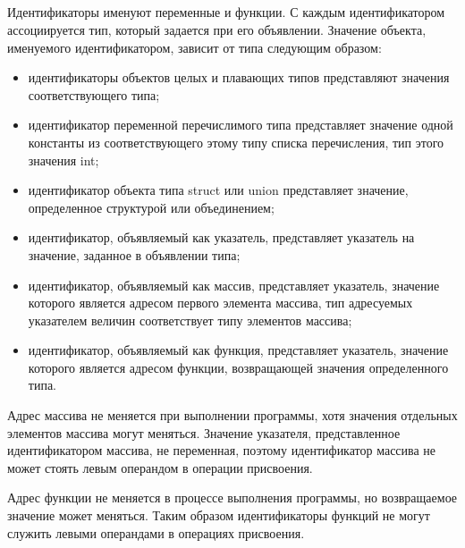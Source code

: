 \subsection{}

Идентификаторы именуют переменные и функции. С каждым идентификатором ассоциируется тип, который задается при его объявлении. Значение объекта, именуемого идентификатором, зависит от типа следующим образом:
\begin{itemize}
\item идентификаторы объектов целых и плавающих типов представляют значения соответствующего типа;
\item идентификатор переменной перечислимого типа представляет значение одной константы из соответствующего этому типу списка перечисления, тип этого значения int;
\item идентификатор объекта типа struct или union представляет значение, определенное структурой или объединением;
\item идентификатор, объявляемый как указатель, представляет указатель на значение, заданное в объявлении типа;  
\item идентификатор, объявляемый как массив, представляет указатель, значение которого является адресом первого элемента массива, тип адресуемых указателем величин соответствует типу элементов массива;  
\item идентификатор, объявляемый как функция, представляет указатель, значение которого является адресом функции, возвращающей значения определенного типа.\killoverfullbefore 
\end{itemize}

Адрес массива не меняется при выполнении программы, хотя значения отдельных элементов массива могут меняться. Значение указателя, представленное идентификатором массива, не переменная, поэтому идентификатор массива не может стоять левым операндом в операции присвоения. 

Адрес функции не меняется в процессе выполнения программы, но возвращаемое значение может меняться. Таким образом идентификаторы функций не могут служить левыми операндами в операциях присвоения.

\subsection{}

